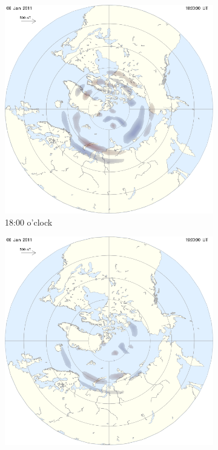 \documentclass[10pt,a4paper]{article}
\begin{document}
\begin{figure}[h]
\centering
\begin{subfigure}{0.3\textwidth}
\centering
	\includegraphics[width=\textwidth]{ampere0.png}
	\caption{ 18:00 o'clock\label{amp18}}
\end{subfigure}
\begin{subfigure}{0.3\textwidth}
\centering
	\includegraphics[width=\textwidth]{ampere1.png}

\end{subfigure}
\end{figure}
\end{document}

